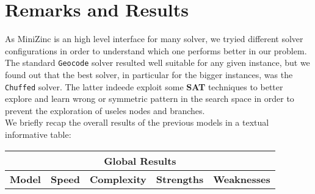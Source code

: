 \section{Remarks and Results}
As MiniZinc is an high level interface for many solver, we tryied different solver configurations in order to understand which one performs better
in our problem. The standard \texttt{Geocode} solver resulted well suitable for any given instance, but we found out that the best solver, in particular
for the bigger instances, was the \texttt{Chuffed} solver. The latter indeede exploit some \textbf{SAT} techniques to better explore and learn wrong or symmetric
pattern in the search space in order to prevent the exploration of useles nodes and branches.\\

We briefly recap the overall results of the previous models in a textual informative table:

\begin{center}
    \begin{adjustwidth}{-1.5cm}{}
        \begin{tabular}{|c|c|c|c|c|}
            \hline
            \multicolumn{5}{|c|}{\textbf{Global Results}} \\
            \hline
            \textbf{Model} & \textbf{Speed} & \textbf{Complexity} & \textbf{Strengths} & \textbf{Weaknesses} \\
            \hline
        \end{tabular}
    \end{adjustwidth}
\end{center}
